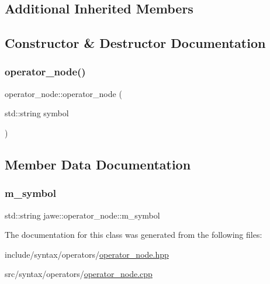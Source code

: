 \subsection*{Additional Inherited Members}


\subsection{Constructor \& Destructor Documentation}
\mbox{\label{classjawe_1_1operator__node_ac5185af17b7c0f8c1f5048bc20a352b9}} 
\subsubsection{\texorpdfstring{operator\+\_\+node()}{operator\_node()}}
{\footnotesize\ttfamily operator\+\_\+node\+::operator\+\_\+node (\begin{DoxyParamCaption}\item[{std\+::string}]{symbol }\end{DoxyParamCaption})}



\subsection{Member Data Documentation}
\mbox{\label{classjawe_1_1operator__node_a30b11040052955f3ed9e487c0c7b76c6}} 
\subsubsection{\texorpdfstring{m\+\_\+symbol}{m\_symbol}}
{\footnotesize\ttfamily std\+::string jawe\+::operator\+\_\+node\+::m\+\_\+symbol\hspace{0.3cm}{\ttfamily [private]}}



The documentation for this class was generated from the following files\+:\begin{DoxyCompactItemize}
\item 
include/syntax/operators/\hyperlink{operator__node_8hpp}{operator\+\_\+node.\+hpp}\item 
src/syntax/operators/\hyperlink{operator__node_8cpp}{operator\+\_\+node.\+cpp}\end{DoxyCompactItemize}
